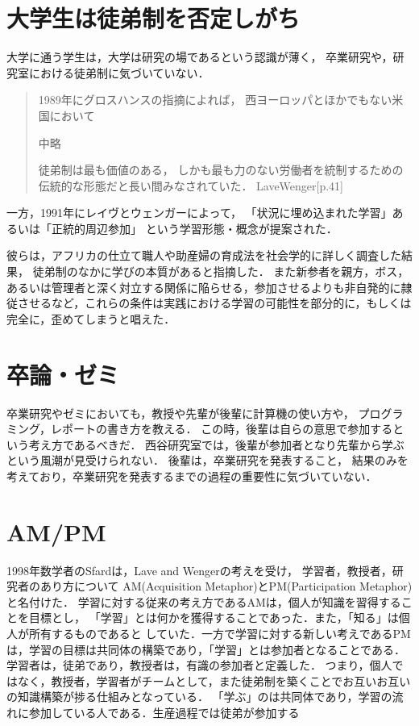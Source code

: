 \documentclass[12pt,a4]{jreport}%
\begin{document}
\chapter{大学生は徒弟制を否定しがち}
\label{sec:org8f2bcb9}
大学に通う学生は，大学は研究の場であるという認識が薄く，
卒業研究や，研究室における徒弟制に気づいていない．

\begin{quote}
1989年にグロスハンスの指摘によれば，
西ヨーロッパとほかでもない米国において

中略

徒弟制は最も価値のある，
しかも最も力のない労働者を統制するための伝統的な形態だと長い間みなされていた．
LaveWenger[p.41]
\end{quote}
一方，1991年にレイヴとウェンガーによって，
「状況に埋め込まれた学習」あるいは「正統的周辺参加」
という学習形態・概念が提案された．

彼らは，アフリカの仕立て職人や助産婦の育成法を社会学的に詳しく調査した結果，
徒弟制のなかに学びの本質があると指摘した．
また新参者を親方，ボス，あるいは管理者と深く対立する関係に陥らせる，参加させるよりも非自発的に隷従させるなど，これらの条件は実践における学習の可能性を部分的に，もしくは完全に，歪めてしまうと唱えた．

\chapter{卒論・ゼミ}
\label{sec:org358da81}
卒業研究やゼミにおいても，教授や先輩が後輩に計算機の使い方や，
プログラミング，レポートの書き方を教える．
この時，後輩は自らの意思で参加するという考え方であるべきだ．
西谷研究室では，後輩が参加者となり先輩から学ぶという風潮が見受けられない．
後輩は，卒業研究を発表すること，
結果のみを考えており，卒業研究を発表するまでの過程の重要性に気づいていない．

\chapter{AM/PM}
\label{sec:orgb6cb26c}
1998年数学者のSfardは，Lave and Wengerの考えを受け，
学習者，教授者，研究者のあり方について
AM(Acquisition Metaphor)とPM(Participation Metaphor)と名付けた．
学習に対する従来の考え方であるAMは，個人が知識を習得することを目標とし，
「学習」とは何かを獲得することであった．また，「知る」は個人が所有するものであると
していた．一方で学習に対する新しい考えであるPMは，学習の目標は共同体の構築であり，「学習」とは参加者となることである．学習者は，徒弟であり，教授者は，有識の参加者と定義した．
つまり，個人ではなく，教授者，学習者がチームとして，また徒弟制を築くことでお互いお互いの知識構築が捗る仕組みとなっている．
「学ぶ」のは共同体であり，学習の流れに参加している人である．生産過程では徒弟が参加する
\end{document}
